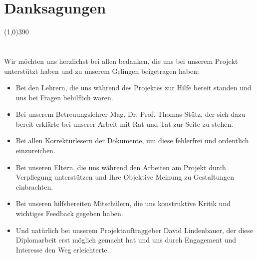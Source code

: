 \documentclass[FIPLY_base.tex]{subfiles}
\begin{document}
	\section{Danksagungen}
	\line(1,0){390}
	\ \\
	\ \\
	\ \\
	Wir möchten uns herzlichst bei allen bedanken, die uns bei unserem Projekt unterstützt haben und zu unserem Gelingen beigetragen haben:
	\ \\
	\begin{itemize}
		\item Bei den Lehrern, die uns während des Projektes zur Hilfe bereit standen und uns bei Fragen behilflich waren.
		\ \\
		\item Bei unserem Betreuungslehrer Mag. Dr. Prof. Thomas Stütz, der sich dazu bereit erklärte bei unserer Arbeit mit Rat und Tat zur Seite zu stehen.
		\ \\
		\item Bei allen Korrekturlesern der Dokumente, um diese fehlerfrei und ordentlich einzureichen.
		\ \\
		\item Bei unseren Eltern, die uns während den Arbeiten am Projekt durch Verpflegung unterstützen und Ihre Objektive Meinung zu Gestaltungen einbrachten.
		\ \\
		\item Bei unseren hilfsbereiten Mitschülern, die uns konstruktive Kritik und wichtiges Feedback gegeben haben.
		\ \\
		\item Und natürlich bei unserem Projektauftraggeber David Lindenbauer, der diese Diplomarbeit erst möglich gemacht hat und uns durch Engagement und Interesse den Weg erleichterte.
	\end{itemize} 
\end{document}
